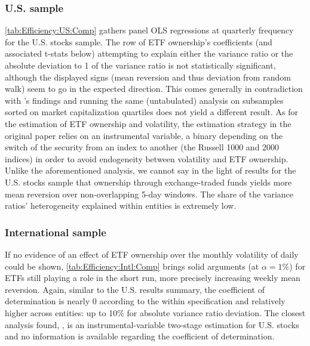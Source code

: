 \subsubsection{U.S. sample}
\autoref{tab:Efficiency:US:Comp} gathers panel OLS regressions at quarterly frequency for the U.S. stocks sample. The row of ETF ownership's coefficients (and associated t-stats below) attempting to explain either the variance ratio or the absolute deviation to 1 of the variance ratio is not statistically significant, although the displayed signs (mean reversion and thus deviation from random walk) seem to go in the expected direction. This comes generally in contradiction with \textcite{Ben-David2018}'s findings and running the same (untabulated) analysis on subsamples sorted on market capitalization quartiles does not yield a different result. As for the estimation of ETF ownership and volatility, the estimation strategy in the original paper relies on an instrumental variable, a binary depending on the switch of the security from an index to another (the Russell 1000 and 2000 indices) in order to avoid endogeneity between volatility and ETF ownership. Unlike the aforementioned analysis, we cannot say in the light of results for the U.S. stocks sample that ownership through exchange-traded funds yields more mean reversion over non-overlapping 5-day windows. The share of the variance ratios' heterogeneity explained within entities is extremely low.

\begin{landscape}
  {\linespread{1.0}
    \begin{table}[htbp]
      
    \end{table}
  }
\end{landscape}

\subsubsection{International sample}
If no evidence of an effect of ETF ownership over the monthly volatility of daily could be shown, \autoref{tab:Efficiency:Intl:Comp} brings solid arguments (at $\alpha = 1\%$) for ETFs still playing a role in the short run, more precisely increasing weekly mean reversion. Again, similar to the U.S. results summary, the coefficient of determination is nearly 0 according to the within specification and relatively higher across entities: up to 10\% for absolute variance ratio deviation. The closest analysis found, \textcite{Ben-David2018}, is an instrumental-variable two-stage estimation for U.S. stocks and no information is available regarding the coefficient of determination.

